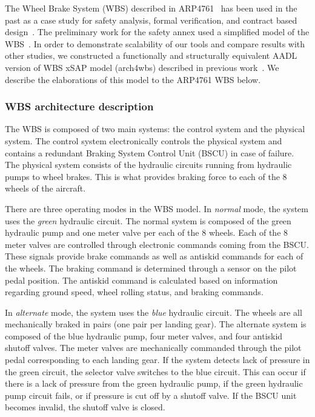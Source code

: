 The Wheel Brake System (WBS) described in ARP4761~\cite{SAE:ARP4761} has been used in the past as a case study for safety analysis, formal verification, and contract based design~\cite{DBLP:conf/cav/BozzanoCPJKPRT15, 10.1007/978-3-319-11936-6-7, CAV2015:BoCiGrMa, Stewart17:IMBSA, propBasedProofSys, Joshi05:SafeComp, NasaRep:MBSA-Aug05}. The preliminary work for the safety annex used a simplified model of the WBS~\cite{Stewart17:IMBSA}. In order to demonstrate scalability of our tools and compare results with other studies, we constructed a functionally and structurally equivalent AADL version of %
 WBS xSAP model (arch4wbs) described in previous work~\cite{DBLP:conf/cav/BozzanoCPJKPRT15}.  %
We describe the elaborations of this model to the ARP4761 WBS below.

\subsubsection{WBS architecture description}
The WBS is composed of two main systems: the control system and the physical system. The control system electronically controls the physical system and contains a redundant Braking System Control Unit (BSCU) in case of failure. The physical system consists of the hydraulic circuits running from hydraulic pumps to wheel brakes. This is what provides braking force to each of the 8 wheels of the aircraft.

There are three operating modes in the WBS model. In \textit{normal} mode, the system uses the \textit{green} hydraulic circuit. The normal system is composed of the green hydraulic pump and one meter valve per each of the 8 wheels. Each of the 8 meter valves are controlled through electronic commands coming from the BSCU. These signals provide brake commands as well as antiskid commands for each of the wheels. The braking command is determined through a sensor on the pilot pedal position. The antiskid command is calculated based on information regarding ground speed, wheel rolling status, and braking commands.

In \textit{alternate} mode, the system uses the \textit{blue} hydraulic circuit.  The wheels are all mechanically braked in pairs (one pair per landing gear). The alternate system is composed of the blue hydraulic pump, four meter valves, and four antiskid shutoff valves. The meter valves are mechanically commanded through the pilot pedal corresponding to each landing gear. If the system detects lack of pressure in the green circuit, the selector valve switches to the blue circuit. This can occur if there is a lack of pressure from the green hydraulic pump, if the green hydraulic pump circuit fails, or if pressure is cut off by a shutoff valve. If the BSCU unit becomes invalid, the shutoff valve is closed.

